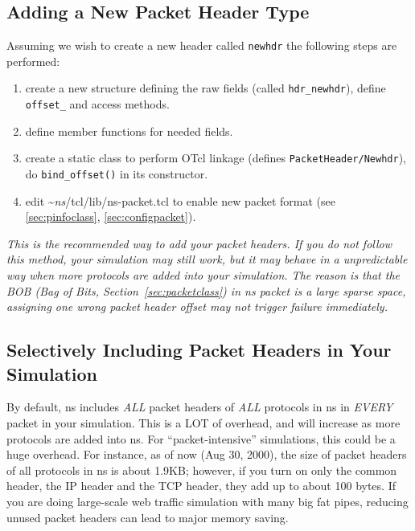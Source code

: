 \subsection{Adding a New Packet Header Type}

Assuming we wish to create a new header called {\tt newhdr}
the following steps are performed:
\begin{enumerate}\itemsep0pt
  \item create a new structure defining the raw fields
        (called {\tt hdr\_newhdr}), define {\tt offset\_} and access
        methods. 
  \item define member functions for needed fields.
  \item create a static class to perform OTcl linkage
        (defines {\tt PacketHeader/Newhdr}), do {\tt bind\_offset()}
        in its constructor. 
  \item edit \textasciitilde\emph{ns}/{tcl/lib/ns-packet.tcl} to enable new packet format
        (see \ref{sec:pinfoclass}, \ref{sec:configpacket}).
\end{enumerate}

{\em This is the recommended way to add your packet headers. 
  If you do
  not follow this method, your simulation may still work, but it may 
  behave in a unpredictable way when more protocols are added into
  your simulation. 
  The reason is that the BOB (Bag of Bits,
  Section~\ref{sec:packetclass}) in \emph{ns} packet is a large
  sparse space, assigning one wrong packet header offset may not
  trigger failure immediately.}

\subsection{Selectively Including Packet Headers in Your Simulation}

By default, ns includes {\em ALL} packet headers of {\em ALL}
protocols in ns in {\em EVERY} packet in your simulation. 
This is a LOT of overhead, and will increase as more
protocols are added into ns.
For ``packet-intensive'' simulations, this could be a huge overhead.
For instance, as of now (Aug 30, 2000), the size of packet headers of
all protocols in ns is about 1.9KB; however, if you turn on only the
common header, the IP header and the TCP header, they add up to about
100 bytes. 
If you are doing large-scale web traffic simulation with many big fat
pipes, reducing unused packet headers can lead to major memory
saving.

